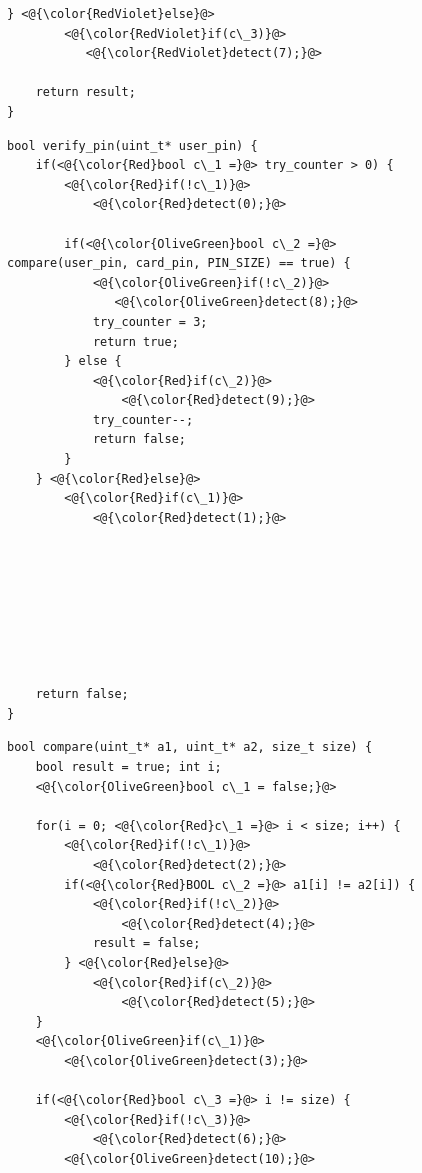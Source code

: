 \begin{figure}[hpt]
\begin{multicols}{2}
\begin{lstlisting}[label=lst:ch6:vp4-compare]
    } <@{\color{RedViolet}else}@>
        <@{\color{RedViolet}if(c\_3)}@>
           <@{\color{RedViolet}detect(7);}@>

    return result;
}
\end{lstlisting}  
\end{multicols}

            \begin{multicols}{2}
\begin{lstlisting}
bool verify_pin(uint_t* user_pin) {
    if(<@{\color{Red}bool c\_1 =}@> try_counter > 0) {
        <@{\color{Red}if(!c\_1)}@>
            <@{\color{Red}detect(0);}@>
            
        if(<@{\color{OliveGreen}bool c\_2 =}@> compare(user_pin, card_pin, PIN_SIZE) == true) {
            <@{\color{OliveGreen}if(!c\_2)}@>
               <@{\color{OliveGreen}detect(8);}@>
            try_counter = 3;
            return true;
        } else {
            <@{\color{Red}if(c\_2)}@>
                <@{\color{Red}detect(9);}@>
            try_counter--;
            return false;
        }
    } <@{\color{Red}else}@>
        <@{\color{Red}if(c\_1)}@>
            <@{\color{Red}detect(1);}@>







    
    return false;
}
\end{lstlisting}  
\columnbreak

\begin{lstlisting}[label=lst:ch6:vp4-compare-res]
bool compare(uint_t* a1, uint_t* a2, size_t size) {
    bool result = true; int i;
    <@{\color{OliveGreen}bool c\_1 = false;}@>
    
    for(i = 0; <@{\color{Red}c\_1 =}@> i < size; i++) { 
        <@{\color{Red}if(!c\_1)}@>
            <@{\color{Red}detect(2);}@>
        if(<@{\color{Red}BOOL c\_2 =}@> a1[i] != a2[i]) {
            <@{\color{Red}if(!c\_2)}@>
                <@{\color{Red}detect(4);}@> 
            result = false; 
        } <@{\color{Red}else}@>
            <@{\color{Red}if(c\_2)}@>
                <@{\color{Red}detect(5);}@>  
    }
    <@{\color{OliveGreen}if(c\_1)}@>
        <@{\color{OliveGreen}detect(3);}@>

    if(<@{\color{Red}bool c\_3 =}@> i != size) {
        <@{\color{Red}if(!c\_3)}@>
            <@{\color{Red}detect(6);}@>
        <@{\color{OliveGreen}detect(10);}@>
    

\end{lstlisting}
\end{multicols}
\end{figure}
